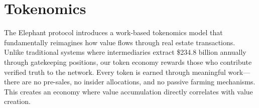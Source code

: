 \chapter{Tokenomics}

The Elephant protocol introduces a work-based tokenomics model that fundamentally reimagines how value flows through real estate transactions. Unlike traditional systems where intermediaries extract \$234.8 billion annually through gatekeeping positions, our token economy rewards those who contribute verified truth to the network. Every token is earned through meaningful work—there are no pre-sales, no insider allocations, and no passive farming mechanisms. This creates an economy where value accumulation directly correlates with value creation.

